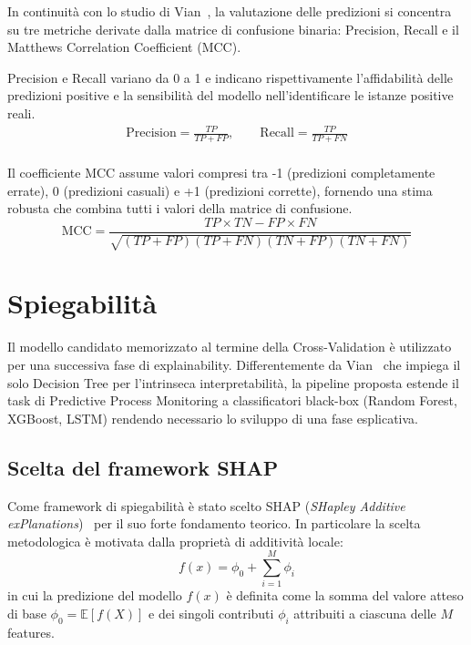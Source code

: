 In continuità con lo studio di Vian~\cite{ppm-human-centered-vian2024}, la valutazione delle predizioni si concentra su tre metriche derivate dalla matrice di confusione binaria: Precision, Recall e il Matthews Correlation Coefficient (MCC).

Precision e Recall variano da 0 a 1 e indicano rispettivamente l'affidabilità delle predizioni positive e la sensibilità del modello nell'identificare le istanze positive reali.
\begin{equation}
    \begin{gathered}
        \text{Precision} = \frac{TP}{TP + FP}, \qquad
        \text{Recall} = \frac{TP}{TP + FN} \\[1.5ex]
    \end{gathered}
    \label{eq:precision_recall_metrics}
\end{equation}

Il coefficiente MCC assume valori compresi tra -1 (predizioni completamente errate), 0 (predizioni casuali) e +1 (predizioni corrette), fornendo una stima robusta che combina tutti i valori della matrice di confusione.
\begin{equation}
    \text{MCC} = \frac{TP \times TN - FP \times FN}{\sqrt{(TP + FP)(TP + FN)(TN + FP)(TN + FN)}}
    \label{eq:mcc_metric}
\end{equation}

\section{Spiegabilità}
\label{sec:pipeline_explainability}
Il modello candidato memorizzato al termine della Cross-Validation è utilizzato per una successiva fase di explainability. Differentemente da Vian~\cite{ppm-human-centered-vian2024} che impiega il solo Decision Tree per l'intrinseca interpretabilità, la pipeline proposta estende il task di Predictive Process Monitoring a classificatori black-box (Random Forest, XGBoost, LSTM) rendendo necessario lo sviluppo di una fase esplicativa.

\subsection{Scelta del framework SHAP}
\label{subsec:shap_framework}
Come framework di spiegabilità è stato scelto SHAP (\textit{SHapley Additive exPlanations})~\cite{xai-shap-lundberg2017} per il suo forte fondamento teorico.
In particolare la scelta metodologica è motivata dalla proprietà di additività locale:
\begin{equation}
    f(x) = \phi_0 + \sum_{i=1}^{M} \phi_i
    \label{eq:shap_additivity}
\end{equation}
in cui la predizione del modello $f(x)$ è definita come la somma del valore atteso di base $\phi_0 = \mathbb{E}[f(X)]$ e dei singoli contributi $\phi_i$ attribuiti a ciascuna delle $M$ features.

